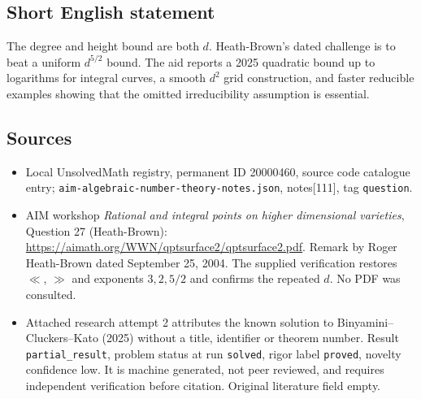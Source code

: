\documentclass[11pt]{article}
\begin{document}
\subsection{Short English statement}
The degree and height bound are both $d$. Heath-Brown's dated challenge is to beat a uniform $d^{5/2}$ bound. The aid reports a 2025 quadratic bound up to logarithms for integral curves, a smooth $d^2$ grid construction, and faster reducible examples showing that the omitted irreducibility assumption is essential.
\subsection{Sources}
\begin{itemize}
\item Local UnsolvedMath registry, permanent ID 20000460, source code catalogue entry; \texttt{aim-algebraic-number-theory-notes.json}, notes[111], tag \texttt{question}.
\item AIM workshop \emph{Rational and integral points on higher dimensional varieties}, Question 27 (Heath-Brown): \url{https://aimath.org/WWN/qptsurface2/qptsurface2.pdf}. Remark by Roger Heath-Brown dated September 25, 2004. The supplied verification restores $\ll$, $\gg$ and exponents $3,2,5/2$ and confirms the repeated $d$. No PDF was consulted.
\item Attached research attempt 2 attributes the known solution to Binyamini--Cluckers--Kato (2025) without a title, identifier or theorem number. Result \texttt{partial\_result}, problem status at run \texttt{solved}, rigor label \texttt{proved}, novelty confidence low. It is machine generated, not peer reviewed, and requires independent verification before citation. Original literature field empty.
\end{itemize}
\end{document}
